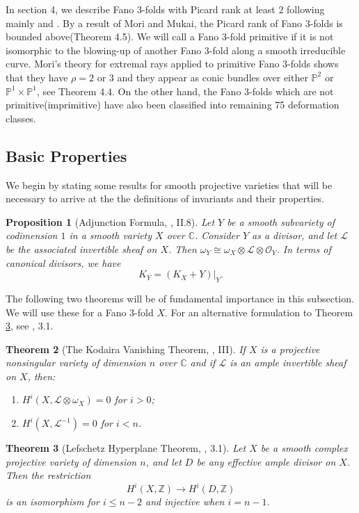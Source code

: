 \documentclass[11pt]{amsart}
\theoremstyle{plain}
\newtheorem{theorem}{Theorem}[section]
\newtheorem{proposition}[theorem]{Proposition}
\theoremstyle{definition}
\theoremstyle{expl}
\begin{document}
In section 4, we describe Fano $3$-folds with Picard rank at least $2$ following mainly \cite{MM81} and \cite{MM83}. By a result of Mori and Mukai, the Picard rank of Fano $3$-folds is bounded above(Theorem 4.5). We will call a Fano $3$-fold primitive if it is not isomorphic to the blowing-up of another Fano $3$-fold along a smooth irreducible curve. 
Mori's theory for extremal rays applied to primitive Fano $3$-folds shows that they have $\rho =2 $ or $3$ and they appear as conic bundles over either $\mathbb{P}^2$ or $\mathbb{P}^1 \times \mathbb{P}^1$, see Theorem 4.4. On the other hand, the Fano $3$-folds which are not primitive(imprimitive) have also been classified into remaining 75 deformation classes. 

\subsection{Basic Properties} We begin by stating some results for smooth projective varieties that will be necessary to arrive at the the definitions of invariants and their properties. 
\begin{proposition}[Adjunction Formula, \cite{Hartshorne}, II.8]
    Let $Y$ be a smooth subvariety of codimension $1$ in a smooth variety $X$ over $\mathbb{C}$. Consider $Y$ as a divisor, and let $\mathcal{L}$ be the associated invertible sheaf on $X$. Then $\omega_Y \cong \omega_X \otimes \mathcal{L}\otimes \mathcal{O}_Y$. In terms of canonical divisors, we have 
    \[
    K_Y = (K_X+Y)|_Y.
    \]
\end{proposition}

The following two theorems will be of fundamental importance in this subsection. We will use these for a Fano $3$-fold $X$. For an alternative formulation to Theorem \ref{C}, see \cite{Laz}, 3.1.
\begin{theorem}[The Kodaira Vanishing Theorem, \cite{Hartshorne}, III] If $X$ is a projective nonsingular variety of dimension $n$ over $\mathbb{C}$ and if $\mathcal{L}$ is an ample invertible sheaf on $X$, then: 
\begin{enumerate}
    \item[a)] $H^i(X, \mathcal{L}\otimes \omega_X) =0$ for $i>0$;
    \item[b)] $H^i(X,\mathcal{L}^{-1})=0$ for $i<n$.
\end{enumerate}
\end{theorem}
\begin{theorem}[Lefschetz Hyperplane Theorem, \cite{Laz}, 3.1]
\label{C}
    Let $X$ be a smooth complex projective variety of dimension $n$, and let $D$ be any effective ample divisor on $X$. Then the restriction 
    \[
    H^i(X,\mathbb{Z}) \rightarrow H^i(D,\mathbb{Z})
    \]
    is an isomorphism for $i\leq n-2$ and injective when $i=n-1$.
\end{theorem}
\end{document}
